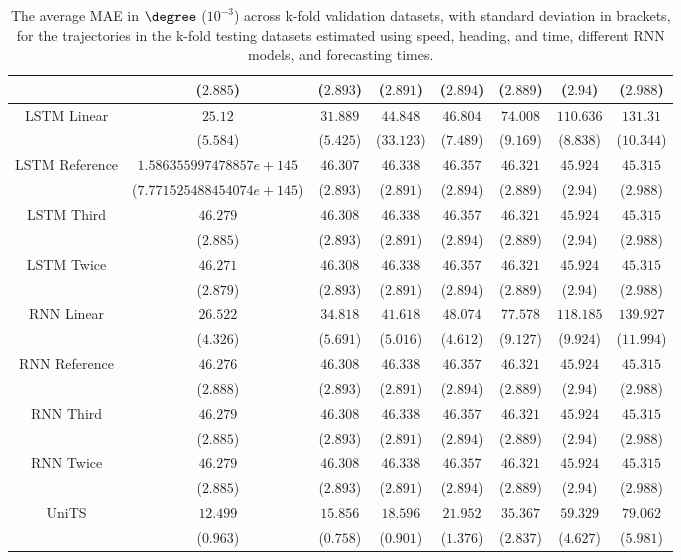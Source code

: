 \begin{table}[!ht]
{\begin{tabular}{|c|c|c|c|c|c|c|c|}
			 & ($2.885$) & ($2.893$) & ($2.891$) & ($2.894$) & ($2.889$) & ($2.94$) & ($2.988$) \\ \hline
			\multirow{2}{*}{LSTM Linear} & $25.12$ & $31.889$ & $44.848$ & $46.804$ & $74.008$ & $110.636$ & $131.31$ \\
			 & ($5.584$) & ($5.425$) & ($33.123$) & ($7.489$) & ($9.169$) & ($8.838$) & ($10.344$) \\ \hline
			\multirow{2}{*}{LSTM Reference} & $1.586355997478857e+145$ & $46.307$ & $46.338$ & $46.357$ & $46.321$ & $45.924$ & $45.315$ \\
			 & ($7.771525488454074e+145$) & ($2.893$) & ($2.891$) & ($2.894$) & ($2.889$) & ($2.94$) & ($2.988$) \\ \hline
			\multirow{2}{*}{LSTM Third} & $46.279$ & $46.308$ & $46.338$ & $46.357$ & $46.321$ & $45.924$ & $45.315$ \\
			 & ($2.885$) & ($2.893$) & ($2.891$) & ($2.894$) & ($2.889$) & ($2.94$) & ($2.988$) \\ \hline
			\multirow{2}{*}{LSTM Twice} & $46.271$ & $46.308$ & $46.338$ & $46.357$ & $46.321$ & $45.924$ & $45.315$ \\
			 & ($2.879$) & ($2.893$) & ($2.891$) & ($2.894$) & ($2.889$) & ($2.94$) & ($2.988$) \\ \hline
			\multirow{2}{*}{RNN Linear} & $26.522$ & $34.818$ & $41.618$ & $48.074$ & $77.578$ & $118.185$ & $139.927$ \\
			 & ($4.326$) & ($5.691$) & ($5.016$) & ($4.612$) & ($9.127$) & ($9.924$) & ($11.994$) \\ \hline
			\multirow{2}{*}{RNN Reference} & $46.276$ & $46.308$ & $46.338$ & $46.357$ & $46.321$ & $45.924$ & $45.315$ \\
			 & ($2.888$) & ($2.893$) & ($2.891$) & ($2.894$) & ($2.889$) & ($2.94$) & ($2.988$) \\ \hline
			\multirow{2}{*}{RNN Third} & $46.279$ & $46.308$ & $46.338$ & $46.357$ & $46.321$ & $45.924$ & $45.315$ \\
			 & ($2.885$) & ($2.893$) & ($2.891$) & ($2.894$) & ($2.889$) & ($2.94$) & ($2.988$) \\ \hline
			\multirow{2}{*}{RNN Twice} & $46.279$ & $46.308$ & $46.338$ & $46.357$ & $46.321$ & $45.924$ & $45.315$ \\
			 & ($2.885$) & ($2.893$) & ($2.891$) & ($2.894$) & ($2.889$) & ($2.94$) & ($2.988$) \\ \hline
			\multirow{2}{*}{UniTS} & $12.499$ & $15.856$ & $18.596$ & $21.952$ & $35.367$ & $59.329$ & $79.062$ \\
			 & ($0.963$) & ($0.758$) & ($0.901$) & ($1.376$) & ($2.837$) & ($4.627$) & ($5.981$) \\ \hline
		\end{tabular}
	}
	\caption{The average MAE in $\degree$ ($10^{-3}$) across k-fold validation datasets, with standard deviation in brackets, for the trajectories in the k-fold testing datasets estimated using speed, heading, and time, different RNN models, and forecasting times.}
	\label{tab:all_speed_actual_dir_MAE}
\end{table}